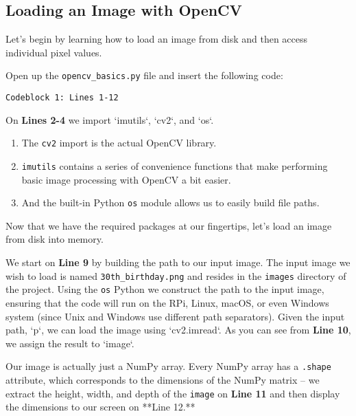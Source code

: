 
\subsection{Loading an Image with OpenCV}

Let’s begin by learning how to load an image from disk and then access individual pixel values.

Open up the \texttt{opencv_basics.py} file and insert the following code:

\begin{verbatim}
Codeblock 1: Lines 1-12
\end{verbatim}

On \textbf{Lines 2-4} we import `imutils`, `cv2`, and `os`.

\begin{enumerate}
    \item The \texttt{cv2} import is the actual OpenCV library.
    \item \texttt{imutils} contains a series of convenience functions that make performing basic image processing with OpenCV a bit easier.
    \item And the built-in Python \texttt{os} module allows us to easily build file paths.
\end{enumerate}

Now that we have the required packages at our fingertips, let’s load an image from disk into memory.

We start on \textbf{Line 9} by building the path to our input image. The input image we wish to load is named \texttt{30th_birthday.png}  and resides in the \texttt{images} directory of the project. Using the \texttt{os} Python we construct the path to the input image, ensuring that the code will run on the RPi, Linux, macOS, or even Windows system (since Unix and Windows use different path separators). Given the input path, `p`, we can load the image using `cv2.imread`. As you can see from \textbf{Line 10}, we assign the result to `image`.

Our image is actually just a NumPy array. Every NumPy array has a \texttt{.shape} attribute, which corresponds to the dimensions of the NumPy matrix -- we extract the height, width, and depth of the \texttt{image} on \textbf{Line 11} and then display the dimensions to our screen on **Line 12.**

